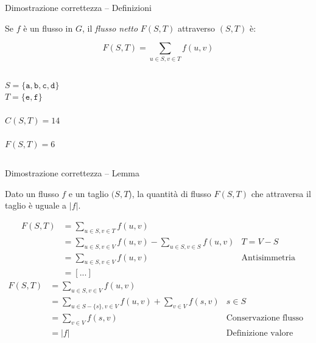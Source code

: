 \begin{frame}{Dimostrazione correttezza -- Definizioni}

\vspace{-9pt}
\begin{myboxtitle}
Se $f$ è un flusso in $G$, il {\em flusso netto} $F(S,T)$ 
attraverso $(S,T)$ è:

\[
  F(S,T) = \sum_{u \in S, v \in T} f(u,v)
\]
\end{myboxtitle}

\vspace{-12pt}
\begin{columns}[T]
\vspace{18pt}
$S = \{ \mathtt{a}, \mathtt{b}, \mathtt{c}, \mathtt{d} \}$\\
$T = \{ \mathtt{e}, \mathtt{f} \}$\\
~\\
$C(S,T) = 14$\\
~\\
$F(S,T) = 6$
\end{columns}

\end{frame}

\begin{frame}{Dimostrazione correttezza -- Lemma    }
    
\vspace{-3pt}
\begin{myboxtitle}
Dato un flusso $f$ e un taglio $(S,T$), la quantità di flusso
$F(S,T)$ che attraversa il taglio è uguale a $|f|$.
\end{myboxtitle}

\medskip
\begin{overprint}
\begin{align*}
F(S,T) &= \sum_{u \in S, v \in T} f(u,v) \\
       &= \sum_{u \in S, v \in V} f(u,v) - \sum_{u \in S, v \in S} f(u,v)& T = V - S\\ 
       &= \sum_{u \in S, v \in V} f(u,v)& \textrm{Antisimmetria}\\
       &= [...] 
\end{align*}
\begin{align*}
F(S,T) &= \sum_{u \in S, v \in V} f(u,v)& \\ 
       &= \sum_{u \in S-\{s\}, v \in V} f(u,v) + \sum_{v \in V} f(s,v) & s \in S\\ 
       &= \sum_{v \in V} f(s,v) & \textrm{Conservazione flusso}\\ 
       &= |f| & \textrm{Definizione valore flusso}
\end{align*}
\end{overprint}
        
\end{frame}




